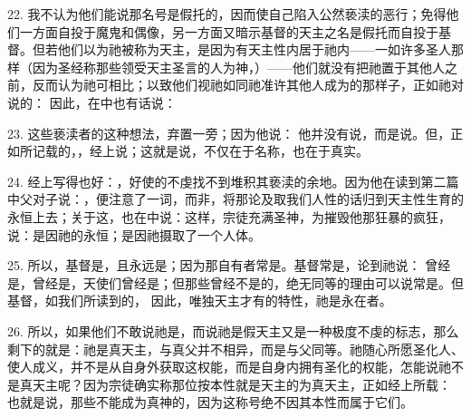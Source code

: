 22. 我不认为他们能说那名号是假托的，因而使自己陷入公然亵渎的恶行；免得他们一方面自投于魔鬼和偶像，另一方面又暗示基督的天主之名是假托而自投于基督。但若他们以为祂被称为天主，是因为有天主性内居于祂内——一如许多圣人那样（因为圣经称那些领受天主圣言的人为神，）——他们就没有把祂置于其他人之前，反而认为祂可相比；以致他们视祂如同祂准许其他人成为的那样子，正如祂对说的： 因此，在中也有话说：\par

23. 这些亵渎者的这种想法，弃置一旁；因为他说： 他并没有说，而是说。但，正如所记载的，，经上说；这就是说，不仅在于名称，也在于真实。\par

24. 经上写得也好：，好使的不虔找不到堆积其亵渎的余地。因为他在读到第二篇中父对子说：，便注意了一词，而非，将那论及取我们人性的话归到天主性生育的永恒上去；关于这，也在中说：这样，宗徒充满圣神，为摧毁他那狂暴的疯狂，说：是因祂的永恒；是因祂摄取了一个人体。\par

25. 所以，基督是，且永远是；因为那自有者常是。基督常是，论到祂说： 曾经是，曾经是，天使们曾经是；但那些曾经不是的，绝无同等的理由可以说常是。但基督，如我们所读到的， 因此，唯独天主才有的特性，祂是永在者。\par

26. 所以，如果他们不敢说祂是，而说祂是假天主又是一种极度不虔的标志，那么剩下的就是：祂是真天主，与真父并不相异，而是与父同等。祂随心所愿圣化人、使人成义，并不是从自身外获取这权能，而是自身内拥有圣化的权能，怎能说祂不是真天主呢？因为宗徒确实称那位按本性就是天主的为真天主，正如经上所载： 也就是说，那些不能成为真神的，因为这称号绝不因其本性而属于它们。\par

